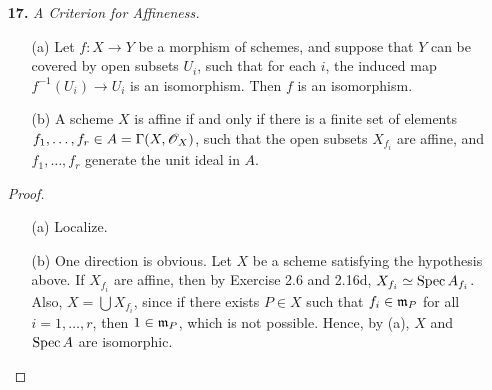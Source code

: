 \documentclass{article}
\begin{document}
\begin{enumerate} [label=\textbf{\arabic*.}, leftmargin=0em]
\begin{proof}
\begin{itemize} [leftmargin=0cm]
        \item[(c)] Let $X = \bigcup_{i = 1}^n U_i$, where $U_i = \spec{A_i}$, and let $X_{f, i} = X_f \cap U_i$. Assume $X_{f, i} \neq \emptyset$. We first show that for some $n_i > 0$, $f^{n_i} b_i$ is the restriction of an element of $\Gamma(U_i, \fO_X) = A_i$, where $b_i$ is the image of $b$ in $\Gamma(X_{f, i}, \fO_X)$. It is not hard to see that $\Gamma(X_{f, i}, \fO_X) = (A_i)_f$, so $b_i = b_i' / f^{n_i}$ for some $b_i' \in A_i$ and $n_i > 0$ (the case is trivial when $n_i = 0$), thus $f^{n_i} b_i$ is an element of $A_i$. Let $n = \max{\{n_i\}}$, then $f^n b_i$ is an element of $A_i$ for all $i$, and for all $i \neq j$, $f^n b_i$ and $f^n b_j$ restrict to the same element on $U_i \cap U_j$, so by part (b), there exists $n_{i, j} > 0$ such that $f^{n_{i, j}}(f^nb_i - f^n b_j) = 0$. Again, let $m = \max\{ n_{i, j} \}$, then $f^{m + n} b$ is the restriction of an element of $A$.

        \item[(d)] The element $f$ is clearly invertible in $\Gamma(X_f, \fO_X)$, so by part (c), every element of $\Gamma(X_f, \fO_X)$ is of the form $a / f^n$ for some $a \in A$ and $n \geq 0$.
    \end{itemize}
\end{proof}

\item[\textbf{17.}] \textit{A Criterion for Affineness.}
\begin{itemize}
    \item[(a)] Let $f : X \to Y$ be a morphism of schemes, and suppose that $Y$ can be covered by open subsets $U_i$, such that for each $i$, the induced map $f^{-1}(U_i) \to U_i$ is an isomorphism. Then $f$ is an isomorphism.
    \item[(b)] A scheme $X$ is affine if and only if there is a finite set of elements $f_1, \dots, f_r \in A = \Gamma(X, \mathscr{O}_X)$, such that the open subsets $X_{f_i}$ are affine, and $f_1, \dots, f_r$ generate the unit ideal in $A$.
\end{itemize}

\begin{proof} $ $ \vspace{0pt}
   \begin{itemize} [leftmargin=0cm]
    \item[(a)] Localize.

    \item[(b)] One direction is obvious. Let $X$ be a scheme satisfying the hypothesis above. If $X_{f_i}$ are affine, then by Exercise 2.6 and 2.16d, $X_{f_i} \simeq \operatorname{Spec}{A_{f_i}}$. Also, $X = \bigcup X_{f_i}$, since if there exists $P \in X$ such that $f_i \in \mathfrak{m}_P$ for all $i = 1, \dots, r$, then $1 \in \mathfrak{m}_P$, which is not possible. Hence, by (a), $X$ and $\operatorname{Spec}{A}$ are isomorphic.
   \end{itemize}
\end{proof}


\end{enumerate}
\end{document}
